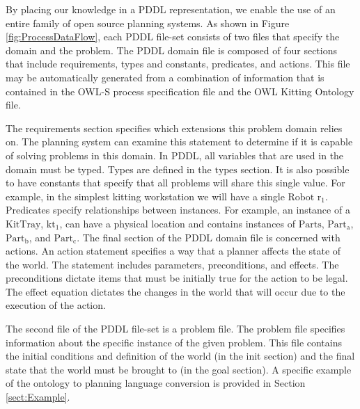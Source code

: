 \documentclass[a4paper, 10pt, conference]{ieeeconf}      %
\begin{document}
By placing our knowledge in a PDDL representation, we enable the use of an entire family of open source planning systems.
As shown in Figure \ref{fig:ProcessDataFlow}, each PDDL file-set consists of two files that specify the domain and the problem. The PDDL domain file is composed of four sections that include
requirements, types and constants, predicates, and actions. This file may be automatically generated from a combination of information that is contained in the OWL-S process specification file and the OWL Kitting Ontology file. 

The requirements section specifies which extensions this problem domain relies on. The planning system can examine this statement to determine if it is capable of solving problems in this domain. In PDDL, all variables that are used in the domain must be typed. Types are defined in the $\mathrm{types}$ section. It is also possible to have constants that specify that all problems will share this single value. For example, in the simplest kitting workstation we will have a single $\mathrm{Robot}$ $\mathrm{r_1}$.
Predicates specify relationships between instances. For example, an instance of a $\mathrm{KitTray}$, $\mathrm{kt_1}$, can have a physical location and contains instances of $\mathrm{Parts}$, $\mathrm{Part_a}$, $\mathrm{Part_b}$, and $\mathrm{Part_c}$. The final section of the PDDL domain file is concerned with actions. An action statement specifies a way that a planner affects the state of the world. The statement includes parameters, preconditions, and effects. The preconditions dictate items that must be initially true for the action to be legal. The effect equation dictates the changes in the world that will occur due to the execution of the action.

The second file of the PDDL file-set is a  problem file. The problem file specifies information about the specific instance of the given problem. This file contains the initial conditions and definition of the world (in the init section) and the final state that the world must be brought to (in the goal section). A specific example of the ontology to planning language conversion is provided in Section \ref{sect:Example}.
\end{document}
